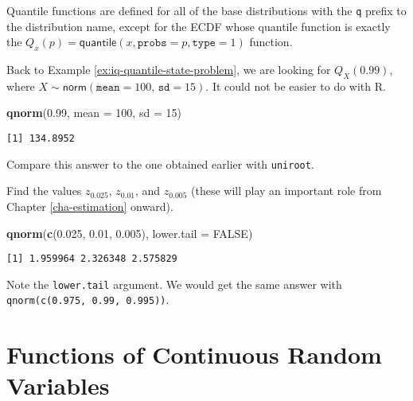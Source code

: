 \documentclass[]{book}
\newenvironment{Shaded}{\begin{snugshade}}{\end{snugshade}}
\newcommand{\KeywordTok}[1]{\textcolor[rgb]{0.13,0.29,0.53}{\textbf{{#1}}}}
\newcommand{\DataTypeTok}[1]{\textcolor[rgb]{0.13,0.29,0.53}{{#1}}}
\newcommand{\DecValTok}[1]{\textcolor[rgb]{0.00,0.00,0.81}{{#1}}}
\newcommand{\FloatTok}[1]{\textcolor[rgb]{0.00,0.00,0.81}{{#1}}}
\newcommand{\OtherTok}[1]{\textcolor[rgb]{0.56,0.35,0.01}{{#1}}}
\newcommand{\NormalTok}[1]{{#1}}
\numberwithin{equation}{chapter}
\numberwithin{figure}{chapter}
\theoremstyle{plain}
\theoremstyle{definition}
\theoremstyle{remark}
\theoremstyle{definition}
\theoremstyle{definition}
\theoremstyle{remark}
\let\BeginKnitrBlock\begin \let\EndKnitrBlock\end
\begin{document}
Quantile functions are defined for all of the base distributions with
the \texttt{q} prefix to the distribution name, except for the ECDF
whose quantile function is exactly the
\(Q_{x}(p) = \mathsf{quantile}(x, \mathtt{probs} = p, \mathtt{type} = 1)\)
function.

\bigskip

\BeginKnitrBlock{example}
\protect\hypertarget{ex:unnamed-chunk-272}{}{\label{ex:unnamed-chunk-272}}Back
to Example \ref{ex:iq-quantile-state-problem}, we are looking for
\(Q_{X}(0.99)\), where
\(X\sim\mathsf{norm}(\mathtt{mean}=100,\,\mathtt{sd}=15)\). It could not
be easier to do with R.
\EndKnitrBlock{example}

\begin{Shaded}
\begin{Highlighting}[]
\KeywordTok{qnorm}\NormalTok{(}\FloatTok{0.99}\NormalTok{, }\DataTypeTok{mean =} \DecValTok{100}\NormalTok{, }\DataTypeTok{sd =} \DecValTok{15}\NormalTok{)}
\end{Highlighting}
\end{Shaded}

\begin{verbatim}
[1] 134.8952
\end{verbatim}

Compare this answer to the one obtained earlier with \texttt{uniroot}.

\bigskip

\BeginKnitrBlock{example}
\protect\hypertarget{ex:unnamed-chunk-274}{}{\label{ex:unnamed-chunk-274}}Find
the values \(z_{0.025}\), \(z_{0.01}\), and \(z_{0.005}\) (these will
play an important role from Chapter \ref{cha-estimation} onward).
\EndKnitrBlock{example}

\begin{Shaded}
\begin{Highlighting}[]
\KeywordTok{qnorm}\NormalTok{(}\KeywordTok{c}\NormalTok{(}\FloatTok{0.025}\NormalTok{, }\FloatTok{0.01}\NormalTok{, }\FloatTok{0.005}\NormalTok{), }\DataTypeTok{lower.tail =} \OtherTok{FALSE}\NormalTok{)}
\end{Highlighting}
\end{Shaded}

\begin{verbatim}
[1] 1.959964 2.326348 2.575829
\end{verbatim}

Note the \texttt{lower.tail} argument. We would get the same answer with
\texttt{qnorm(c(0.975,\ 0.99,\ 0.995))}.

\section{Functions of Continuous Random
Variables}\label{sec-functions-of-continuous}
\end{document}
